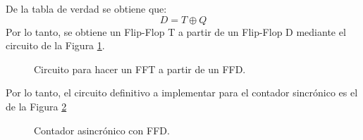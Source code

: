 %
\noindent
De la tabla de verdad se obtiene que:
%
\begin{equation}
	D = T \oplus Q
\end{equation}
%
Por lo tanto, se obtiene un Flip-Flop T a partir de un Flip-Flop D mediante el circuito de la Figura \ref{ej7_fig:FFDaFFT}.
%
\begin{figure}[H]
	\centering
	\caption{Circuito para hacer un FFT a partir de un FFD.}
	\label{ej7_fig:FFDaFFT}
\end{figure}
%
\noindent
Por lo tanto, el circuito definitivo a implementar para el contador sincr\'onico es el de la Figura \ref{ej7_fig:AsincFinal}

%
\begin{figure}[H]
	\centering
	\caption{Contador asincr\'onico con FFD.}
	\label{ej7_fig:AsincFinal}
\end{figure}
%
